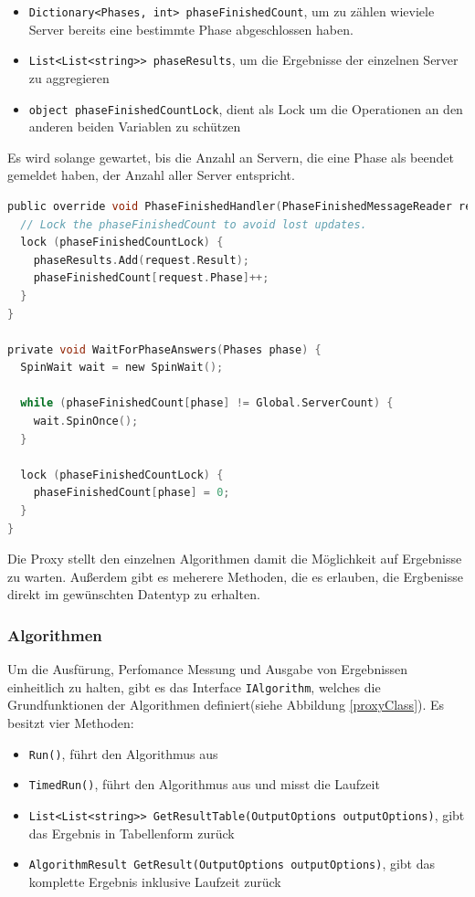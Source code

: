 \begin{itemize}
  \item \verb|Dictionary<Phases, int> phaseFinishedCount|, um zu zählen wieviele Server bereits eine bestimmte Phase abgeschlossen haben.
  \item \verb|List<List<string>> phaseResults|, um die Ergebnisse der einzelnen Server zu aggregieren
  \item \verb|object phaseFinishedCountLock|, dient als Lock um die Operationen an den anderen beiden Variablen zu schützen
\end{itemize}

Es wird solange gewartet, bis die Anzahl an Servern, die eine Phase als beendet gemeldet haben, der Anzahl aller Server entspricht.

\begin{lstlisting}[language=c, caption={Implementierung des Mechanismus, um auf Phasen zu warten.}]
public override void PhaseFinishedHandler(PhaseFinishedMessageReader request) {
  // Lock the phaseFinishedCount to avoid lost updates.
  lock (phaseFinishedCountLock) {
    phaseResults.Add(request.Result);
    phaseFinishedCount[request.Phase]++;
  }
}

private void WaitForPhaseAnswers(Phases phase) {
  SpinWait wait = new SpinWait();

  while (phaseFinishedCount[phase] != Global.ServerCount) {
    wait.SpinOnce();
  }

  lock (phaseFinishedCountLock) {
    phaseFinishedCount[phase] = 0;
  }
}
\end{lstlisting}

Die Proxy stellt den einzelnen Algorithmen damit die Möglichkeit auf Ergebnisse zu warten. Außerdem gibt es meherere Methoden, die es erlauben, die Ergbenisse direkt im gewünschten Datentyp zu erhalten.

\subsubsection{Algorithmen}

Um die Ausfürung, Perfomance Messung und Ausgabe von Ergebnissen einheitlich zu halten, gibt es das Interface \verb|IAlgorithm|, welches die Grundfunktionen der Algorithmen definiert(siehe Abbildung \ref{proxyClass}).
Es besitzt vier Methoden:

\begin{itemize}
  \item \verb|Run()|, führt den Algorithmus aus
  \item \verb|TimedRun()|, führt den Algorithmus aus und misst die Laufzeit
  \item \verb|List<List<string>> GetResultTable(OutputOptions outputOptions)|, gibt das Ergebnis in Tabellenform zurück
  \item \verb|AlgorithmResult GetResult(OutputOptions outputOptions)|, gibt das komplette Ergebnis inklusive Laufzeit zurück
\end{itemize}

